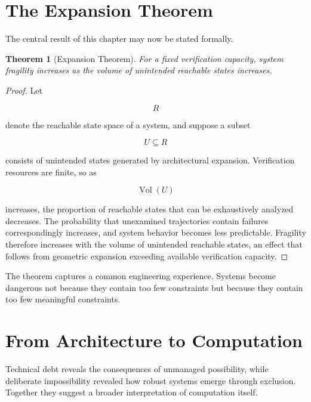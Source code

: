 \documentclass[11pt,oneside]{book}
\theoremstyle{plain}
\newtheorem{theorem}{Theorem}[chapter]
\theoremstyle{definition}
\theoremstyle{remark}
\DeclareMathOperator{\Vol}{Vol}
\begin{document}
\section{The Expansion Theorem}

The central result of this chapter may now be stated formally.

\begin{theorem}[Expansion Theorem]
For a fixed verification capacity, system fragility increases as the volume of unintended reachable states increases.
\end{theorem}

\begin{proof}
Let

\begin{equation}
R
\end{equation}

denote the reachable state space of a system, and suppose a subset

\begin{equation}
U
\subseteq
R
\end{equation}

consists of unintended states generated by architectural expansion. Verification resources are finite, so as

\begin{equation}
\Vol(U)
\end{equation}

increases, the proportion of reachable states that can be exhaustively analyzed decreases. The probability that unexamined trajectories contain failures correspondingly increases, and system behavior becomes less predictable. Fragility therefore increases with the volume of unintended reachable states, an effect that follows from geometric expansion exceeding available verification capacity.
\end{proof}

The theorem captures a common engineering experience. Systems become dangerous not because they contain too few constraints but because they contain too few meaningful constraints.

\section{From Architecture to Computation}

Technical debt reveals the consequences of unmanaged possibility, while deliberate impossibility revealed how robust systems emerge through exclusion. Together they suggest a broader interpretation of computation itself.
\end{document}
